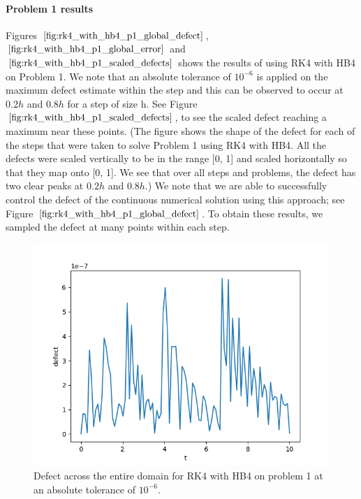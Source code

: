 \paragraph{Problem 1 results}
Figures $\ref{fig:rk4_with_hb4_p1_global_defect}$, $\ref{fig:rk4_with_hb4_p1_global_error}$ and $\ref{fig:rk4_with_hb4_p1_scaled_defects}$ shows the results of using RK4 with HB4 on Problem 1. We note that an absolute tolerance of $10^{-6}$ is applied on the maximum defect estimate within the step and this can be observed to occur at $0.2h$ and $0.8h$ for a step of size h. See Figure $\ref{fig:rk4_with_hb4_p1_scaled_defects}$, to see the scaled defect reaching a maximum near these points. (The figure shows the shape of the defect for each of the steps that were taken to solve Problem 1 using RK4 with HB4. All the defects were scaled vertically to be in the range [0, 1] and scaled horizontally so that they map onto [0, 1]. We see that over all steps and problems, the defect has two clear peaks at $0.2h$ and $0.8h$.) We note that we are able to successfully control the defect of the continuous numerical solution using this approach; see Figure $\ref{fig:rk4_with_hb4_p1_global_defect}$. To obtain these results, we sampled the defect at many points within each step.

\begin{figure}[H]
\centering
\includegraphics[width=0.7\linewidth]{./figures/rk4_with_hb4_p1_global_defect}
\caption{Defect across the entire domain for RK4 with HB4 on problem 1 at an absolute tolerance of $10^{-6}$.}
\label{fig:rk4_with_hb4_p1_global_defect}
\end{figure}

